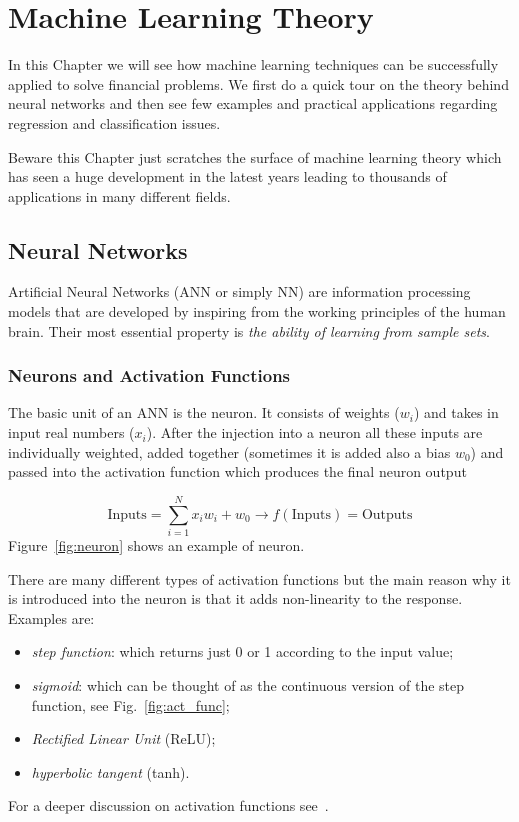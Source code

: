 \chapter{Machine Learning Theory}
\label{ch:neural-network}

In this Chapter we will see how machine learning techniques can be successfully applied to solve financial problems. We first do a quick tour on the theory behind neural networks and then see few examples and practical applications regarding regression and classification issues.

Beware this Chapter just scratches the surface of machine learning theory which has seen a huge development in the latest years leading to thousands of applications in many different fields.
    
\section{Neural Networks}\label{neural-networks}

Artificial Neural Networks (ANN or simply NN) are information processing models that are developed by inspiring from the working principles of the human brain. Their most essential property is \emph{the ability of learning from sample sets}.

\subsection{Neurons and Activation Functions}
The basic unit of an ANN is the neuron. It consists of weights ($w_i$) and takes in input real numbers ($x_i$). After the injection into a neuron all these inputs are individually weighted, added together (sometimes it is added also a bias $w_0$) and passed into the activation function which produces the final neuron output

\begin{equation}
\textrm{Inputs} = \sum_{i=1}^{N} x_i w_i + w_0 \rightarrow f(\textrm{Inputs}) = \textrm{Outputs}
\end{equation}
Figure~\ref{fig:neuron} shows an example of neuron.

There are many different types of activation functions but the main reason why it is introduced into the neuron is that it adds non-linearity to the response. Examples are:
\begin{itemize}
\item \emph{step function}: which returns just 0 or 1 according to the input value;
\item \emph{sigmoid}: which can be thought of as the continuous version of the step function, see Fig.~\ref{fig:act_func};
\item \emph{Rectified Linear Unit} (ReLU);
\item \emph{hyperbolic tangent} (tanh).
\end{itemize}
For a deeper discussion on activation functions see~\cite{bib:activation_function}.

